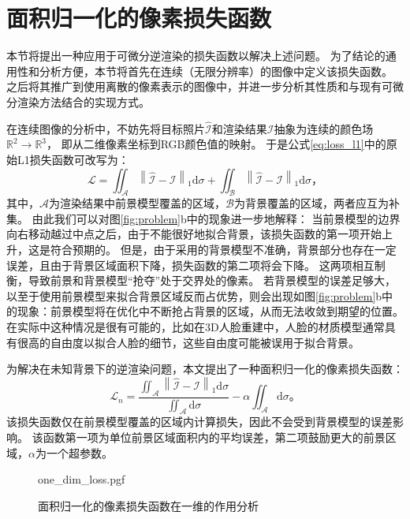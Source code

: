 \section{面积归一化的像素损失函数}

本节将提出一种应用于可微分逆渲染的损失函数以解决上述问题。
为了结论的通用性和分析方便，本节将首先在连续（无限分辨率）的图像中定义该损失函数。
之后将其推广到使用离散的像素表示的图像中，并进一步分析其性质和与现有可微分渲染方法结合的实现方式。

在连续图像的分析中，不妨先将目标照片$\hat{\mathcal{I}}$和渲染结果$\mathcal{I}$抽象为连续的颜色场$\mathbb{R}^2 \to \mathbb{R}^3$，
即从二维像素坐标到RGB颜色值的映射。
于是公式\eqref{eq:loss_l1}中的原始L1损失函数可改写为：
\begin{equation}
\mathcal{L} = \iint_{\mathcal{A}} \left\| \hat{\mathcal{I}} - \mathcal{I} \right\|_1 \mathrm{d}\sigma +
\iint_{\mathcal{B}} \left\| \hat{\mathcal{I}} - \mathcal{I} \right\|_1 \mathrm{d}\sigma
\text{，}
\label{eq:loss_l1_area}
\end{equation}
其中，$\mathcal{A}$为渲染结果中前景模型覆盖的区域，$\mathcal{B}$为背景覆盖的区域，两者应互为补集。
由此我们可以对图\ref{fig:problem}b中的现象进一步地解释：
当前景模型的边界向右移动越过中点之后，由于不能很好地拟合背景，该损失函数的第一项开始上升，这是符合预期的。
但是，由于采用的背景模型不准确，背景部分也存在一定误差，且由于背景区域面积下降，损失函数的第二项将会下降。
这两项相互制衡，导致前景和背景模型“抢夺”处于交界处的像素。
若背景模型的误差足够大，以至于使用前景模型来拟合背景区域反而占优势，则会出现如图\ref{fig:problem}b中的现象：前景模型将在优化中不断抢占背景的区域，从而无法收敛到期望的位置。
在实际中这种情况是很有可能的，比如在3D人脸重建中，人脸的材质模型通常具有很高的自由度以拟合人脸的细节，这些自由度可能被误用于拟合背景。

为解决在未知背景下的逆渲染问题，本文提出了一种面积归一化的像素损失函数：
\begin{equation}
\mathcal{L}_n = \frac{\iint_{\mathcal{A}} \left\| \hat{\mathcal{I}} - \mathcal{I} \right\|_1 \mathrm{d}\sigma}
{\iint_{\mathcal{A}}\mathrm{d}\sigma}
-\alpha\iint_{\mathcal{A}}\mathrm{d}\sigma
\text{。}
\label{eq:loss_n}
\end{equation}
该损失函数仅在前景模型覆盖的区域内计算损失，因此不会受到背景模型的误差影响。
该函数第一项为单位前景区域面积内的平均误差，第二项鼓励更大的前景区域，$\alpha$为一个超参数。

\begin{figure}
\centering
{one_dim_loss.pgf}
\caption{面积归一化的像素损失函数在一维的作用分析}
\label{fig:one_dim_loss}
\end{figure}

